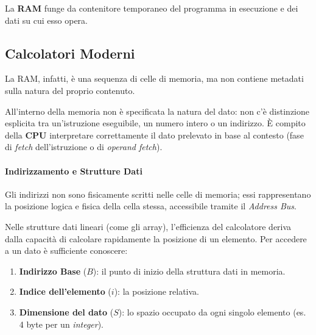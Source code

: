 \documentclass[a4paper,12pt]{article}
\begin{document}
	La \textbf{RAM} funge da contenitore temporaneo del programma in esecuzione e dei dati su cui esso opera.
	\subsection{Calcolatori Moderni}
	\begin{center}
	\end{center}
	 La RAM, infatti, è una sequenza di celle di memoria, ma non contiene metadati sulla natura del proprio contenuto.
	
	\begin{tcolorbox}[colback=red!5!white,colframe=red!75!black,title=Nota Bene: Trasparenza della Memoria]
		All'interno della memoria non è specificata la natura del dato: non c'è distinzione esplicita tra un'istruzione eseguibile, un numero intero o un indirizzo. È compito della \textbf{CPU} interpretare correttamente il dato prelevato in base al contesto (fase di \textit{fetch} dell'istruzione o di \textit{operand fetch}).
	\end{tcolorbox}
	
	\paragraph{Indirizzamento e Strutture Dati}
	Gli indirizzi non sono fisicamente scritti nelle celle di memoria; essi rappresentano la posizione logica e fisica della cella stessa, accessibile tramite il \textit{Address Bus}. 
	
	Nelle strutture dati lineari (come gli array), l'efficienza del calcolatore deriva dalla capacità di calcolare rapidamente la posizione di un elemento. Per accedere a un dato è sufficiente conoscere:
	\begin{enumerate}
		\item \textbf{Indirizzo Base} ($B$): il punto di inizio della struttura dati in memoria.
		\item \textbf{Indice dell'elemento} ($i$): la posizione relativa.
		\item \textbf{Dimensione del dato} ($S$): lo spazio occupato da ogni singolo elemento (es. 4 byte per un \textit{integer}).
	\end{enumerate}
	
\end{document}
